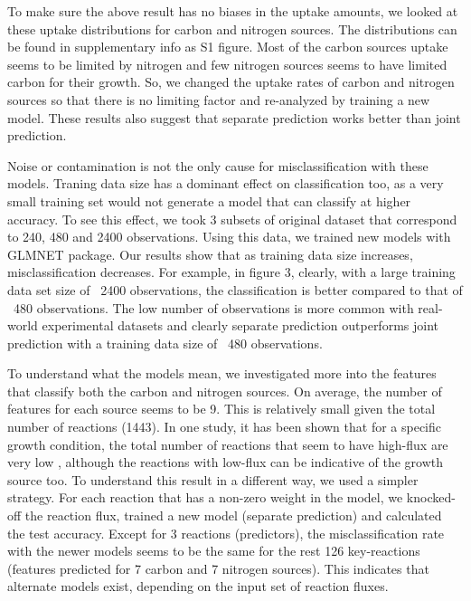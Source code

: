 \documentclass[12pt]{article}
\begin{document}
\bigskip
\noindent
To make sure the above result has no biases in the uptake amounts, we looked at these uptake distributions for carbon and nitrogen sources. The distributions can be found in supplementary info as S1 figure. Most of the carbon sources uptake seems to be limited by nitrogen and few nitrogen sources seems to have limited carbon for their growth. So, we changed the uptake rates of carbon and nitrogen sources so that there is no limiting factor and re-analyzed by training a new model. These results also suggest that separate prediction works better than joint prediction.

\bigskip
\noindent
Noise or contamination is not the only cause for misclassification with these models. Traning data size has a dominant effect on classification too, as a very small training set would not generate a model that can classify at higher accuracy. To see this effect, we took 3 subsets of original dataset that correspond to 240, 480 and 2400 observations. Using this data, we trained new models with GLMNET package. Our results show that as training data size increases, misclassification decreases. For example, in figure 3, clearly, with a large training data set size of ~2400 observations, the classification is better compared to that of ~480 observations. The low number of observations is more common with real-world experimental datasets and clearly separate prediction outperforms joint prediction with a training data size of ~480 observations.

\bigskip
\noindent
To understand what the models mean, we investigated more into the features that classify both the carbon and nitrogen sources. On average, the number of features for each source seems to be 9. This is relatively small given the total number of reactions (1443). In one study, it has been shown that for a specific growth condition, the total number of reactions that seem to have high-flux are very low \cite{Almaasetal2004}, although the reactions with low-flux can be indicative of the growth source too. To understand this result in a different way, we used a simpler strategy. For each reaction that has a non-zero weight in the model, we knocked-off the reaction flux, trained a new model (separate prediction) and calculated the test accuracy. Except for 3 reactions (predictors), the misclassification rate with the newer models seems to be the same for the rest 126 key-reactions (features predicted for 7 carbon and 7 nitrogen sources). This indicates that alternate models exist, depending on the input set of reaction fluxes.
\end{document}
